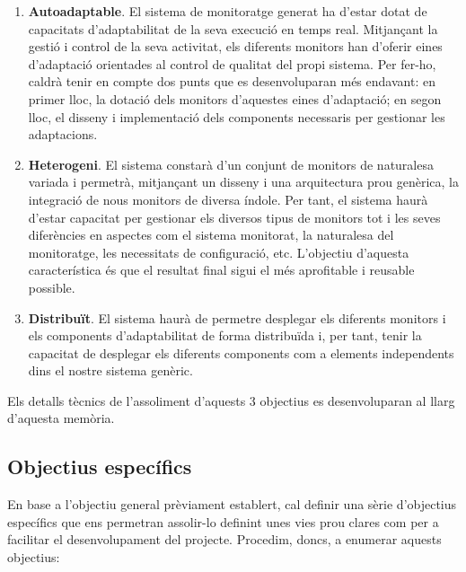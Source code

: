 \begin{enumerate}
\item \textbf{Autoadaptable}. El sistema de monitoratge generat ha d'estar dotat de capacitats d'adaptabilitat de la seva execució en temps real. Mitjançant la gestió i control de la seva activitat, els diferents monitors han d'oferir eines d'adaptació orientades al control de qualitat del propi sistema. Per fer-ho, caldrà tenir en compte dos punts que es desenvoluparan més endavant: en primer lloc, la dotació dels monitors d'aquestes eines d'adaptació; en segon lloc, el disseny i implementació dels components necessaris per gestionar les adaptacions.
\item \textbf{Heterogeni}. El sistema constarà d’un conjunt de monitors de naturalesa variada i permetrà, mitjançant un disseny i una arquitectura prou genèrica, la integració de nous monitors de diversa índole. Per tant, el sistema haurà d’estar capacitat per gestionar els diversos tipus de monitors tot i les seves diferències en aspectes com el sistema monitorat, la naturalesa del monitoratge, les necessitats de configuració, etc. L'objectiu d'aquesta característica és que el resultat final sigui el més aprofitable i reusable possible.
\item \textbf{Distribuït}. El sistema haurà de permetre desplegar els diferents monitors i els components d'adaptabilitat de forma distribuïda i, per tant, tenir la capacitat de desplegar els diferents components com a elements independents dins el nostre sistema genèric.
\end{enumerate}

Els detalls tècnics de l'assoliment d'aquests 3 objectius es desenvoluparan al llarg d'aquesta memòria. 

\subsection{Objectius específics}

En base a l’objectiu general prèviament establert, cal definir una sèrie d’objectius específics que ens permetran assolir-lo definint unes vies prou clares com per a facilitar el desenvolupament del projecte. Procedim, doncs, a enumerar aquests objectius:

